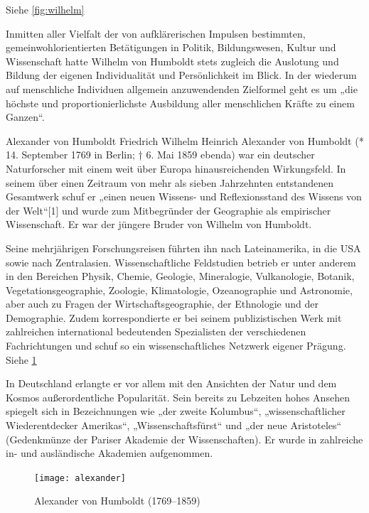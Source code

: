 Siehe \ref{fig:wilhelm}

Inmitten aller Vielfalt der von aufklärerischen Impulsen bestimmten, gemeinwohlorientierten Betätigungen in Politik, Bildungswesen, Kultur und Wissenschaft hatte Wilhelm von Humboldt stets zugleich die Auslotung und Bildung der eigenen Individualität und Persönlichkeit im Blick. In der wiederum auf menschliche Individuen allgemein anzuwendenden Zielformel geht es um „die höchste und proportionierlichste Ausbildung aller menschlichen Kräfte zu einem Ganzen“.


Alexander von Humboldt
Friedrich Wilhelm Heinrich Alexander von Humboldt (* 14. September 1769 in Berlin; † 6. Mai 1859 ebenda) war ein deutscher Naturforscher mit einem weit über Europa hinausreichenden Wirkungsfeld. In seinem über einen Zeitraum von mehr als sieben Jahrzehnten entstandenen Gesamtwerk schuf er „einen neuen Wissens- und Reflexionsstand des Wissens von der Welt“[1] und wurde zum Mitbegründer der Geographie als empirischer Wissenschaft. Er war der jüngere Bruder von Wilhelm von Humboldt.

Seine mehrjährigen Forschungsreisen führten ihn nach Lateinamerika, in die USA sowie nach Zentralasien. Wissenschaftliche Feldstudien betrieb er unter anderem in den Bereichen Physik, Chemie, Geologie, Mineralogie, Vulkanologie, Botanik, Vegetationsgeographie, Zoologie, Klimatologie, Ozeanographie und Astronomie, aber auch zu Fragen der Wirtschaftsgeographie, der Ethnologie und der Demographie. Zudem korrespondierte er bei seinem publizistischen Werk mit zahlreichen international bedeutenden Spezialisten der verschiedenen Fachrichtungen und schuf so ein wissenschaftliches Netzwerk eigener Prägung.
Siehe \ref{fig:alexander}

In Deutschland erlangte er vor allem mit den Ansichten der Natur und dem Kosmos außerordentliche Popularität. Sein bereits zu Lebzeiten hohes Ansehen spiegelt sich in Bezeichnungen wie „der zweite Kolumbus“, „wissenschaftlicher Wiederentdecker Amerikas“, „Wissenschaftsfürst“ und „der neue Aristoteles“ (Gedenkmünze der Pariser Akademie der Wissenschaften). Er wurde in zahlreiche in- und ausländische Akademien aufgenommen.

\begin{figure}
\texttt{[image: alexander]}
\caption{Alexander von Humboldt (1769--1859)}
\label{fig:alexander}
\end{figure}


